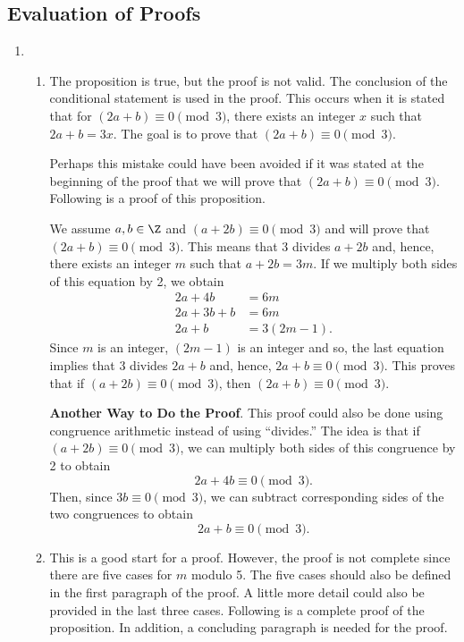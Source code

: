 \subsection*{Evaluation of Proofs}
\setcounter{oldenumi}{\theenumi}
\begin{enumerate} \setcounter{enumi}{\theoldenumi}
\item \begin{enumerate}
\item The proposition is true, but the proof is not valid.  The conclusion of the conditional statement is used in the proof.  This occurs when it is stated that for 
$(2a + b) \equiv 0 \pmod 3$, there exists an integer $x$ such that $2a + b = 3x$.  The goal is to prove that $(2a + b) \equiv 0 \pmod 3$.

Perhaps this mistake could have been avoided if it was stated at the beginning of the proof that we will prove that $(2a + b) \equiv 0 \pmod 3$.  Following is a proof of this proposition.

\begin{myproof}
We assume $a, b \in \Z$ and $(a + 2b) \equiv 0 \pmod 3$ and will prove that 
$(2a + b) \equiv 0 \pmod 3$.  This means that 3 divides $a + 2b$ and, hence, there exists an integer $m$ such that $a + 2b = 3m$.  If we multiply both sides of this equation by 2, we obtain
\begin{align*}
    2a + 4b &= 6m \\
2a + 3b + b &= 6m \\
     2a + b &= 3(2m - 1).
\end{align*}
Since $m$ is an integer, $(2m - 1)$ is an integer and so, the last equation implies that 3 divides $2a + b$ and, hence, $2a + b \equiv 0 \pmod 3$.  This proves that if $(a + 2b) \equiv 0 \pmod 3$, then $(2a + b) \equiv 0 \pmod 3$.
\end{myproof}

\noindent
\textbf{Another Way to Do the Proof}.  
This proof could also be done using congruence arithmetic instead of using ``divides.''  The idea is that if $(a + 2b) \equiv 0 \pmod 3$, we can multiply both sides of this congruence by 2 to obtain
\[
2a + 4b \equiv 0 \pmod 3.
\]
Then, since $3b \equiv 0 \pmod 3$, we can subtract corresponding sides of the two congruences to obtain
\[
2a + b \equiv 0 \pmod 3.
\]

\item This is a good start for a proof.  However, the proof is not complete since there are five cases for $m$ modulo 5.  The five cases should also be defined in the first paragraph of the proof. A little more detail could also be provided in the last three cases. Following is a complete proof of the proposition.  In addition, a concluding paragraph is needed for the proof.


\end{enumerate}
\end{enumerate}
